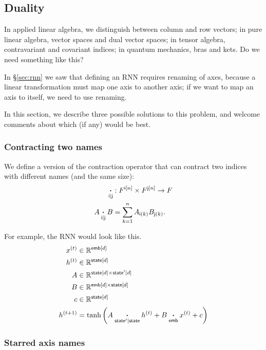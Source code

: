 \subsection{Duality}
\label{sec:duality}

In applied linear algebra, we distinguish between column and row vectors; in pure linear algebra, vector spaces and dual vector spaces; in tensor algebra, contravariant and covariant indices; in quantum mechanics, bras and kets. Do we need something like this?

In \S\ref{sec:rnn} we saw that defining an RNN requires renaming of axes, because a linear transformation must map one axis to another axis; if we want to map an axis to itself, we need to use renaming.

In this section, we describe three possible solutions to this problem, and welcome comments about which (if any) would be best.

\subsubsection{Contracting two names}

We define a version of the contraction operator that can contract two indices with different names (and the same size):
\begin{align*}
\mathbin{\mathop{\boldsymbol\cdot}\limits_{\mathsf{i}|\mathsf{j}}} &: F^{\mathsf{i}[n]} \times F^{\mathsf{j}[n]} \rightarrow F \\
A \mathbin{\mathop{\boldsymbol\cdot}\limits_{\mathsf{i}|\mathsf{j}}} B &= \sum_{k=1}^n A_{\mathsf{i}(k)} B_{\mathsf{j}(k)}.
\end{align*}

For example, the RNN would look like this.
\begin{align*}
x^{(t)} &\in \mathbb{R}^{\mathsf{emb}[d]} \\
h^{(t)} &\in \mathbb{R}^{\mathsf{state}[d]} \\
A &\in \mathbb{R}^{\mathsf{state}[d] \times \mathsf{state'}[d]} \\
B &\in \mathbb{R}^{\mathsf{emb}[d] \times \mathsf{state}[d]} \\
c &\in \mathbb{R}^{\mathsf{state}[d]} \\
h^{(t+1)} &= \tanh\left( A \mathbin{\mathop{\boldsymbol\cdot}\limits_{\mathsf{state'}|\mathsf{state}}} h^{(t)} + B \mathbin{\mathop{\boldsymbol\cdot}\limits_{\mathsf{emb}}} x^{(t)} + c \right)
\end{align*}

\subsubsection{Starred axis names}

